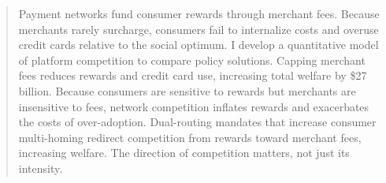 \documentclass[12pt]{article}
\begin{document}
\thispagestyle{empty}

\begin{abstract}
\begin{singlespace}
    \footnotesize
Payment networks fund consumer rewards through merchant fees.
Because merchants rarely surcharge, consumers fail to internalize costs and overuse credit cards relative to the social optimum.
I develop a quantitative model of platform competition to compare policy solutions.
Capping merchant fees reduces rewards and credit card use, increasing total welfare by \$27 billion.
Because consumers are sensitive to rewards but merchants are insensitive to fees, network competition inflates rewards and exacerbates the costs of over-adoption.
Dual-routing mandates that increase consumer multi-homing redirect competition from rewards toward merchant fees, increasing welfare.
The direction of competition matters, not just its intensity.

\end{singlespace}
\end{abstract}

\clearpage

\newpage{}

\end{document}
